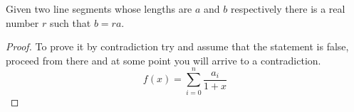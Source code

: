  \begin{theorem}
 	Given two line segments whose lengths are $a$ and $b$ respectively there 
 	is a real number $r$ such that $b=ra$.
 \end{theorem}
 
 \begin{proof}
 	To prove it by contradiction try and assume that the statement is false,
 	proceed from there and at some point you will arrive to a contradiction.
 	\begin{equation*}
 	 f(x) = \sum_{i=0}^{n} \frac{a_i}{1+x} 
 	\end{equation*}
 \end{proof}
